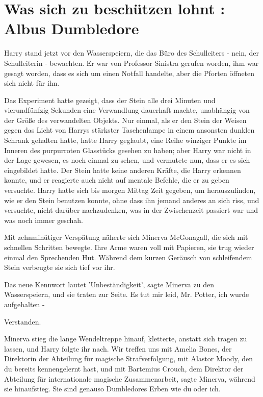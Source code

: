 \chapter{Was sich zu beschützen lohnt : Albus Dumbledore}

Harry stand jetzt vor den Wasserspeiern, die das Büro des Schulleiters - nein,
der Schulleiterin - bewachten. Er war von Professor Sinistra gerufen worden, ihm
war gesagt worden, dass es sich um einen Notfall handelte, aber die Pforten
öffneten sich nicht für ihn.

Das Experiment hatte gezeigt, dass der Stein alle drei Minuten und
vierundfünfzig Sekunden eine Verwandlung dauerhaft machte, unabhängig von der
Größe des verwandelten Objekts. Nur einmal, als er den Stein der Weisen gegen
das Licht von Harrys stärkster Taschenlampe in einem ansonsten dunklen Schrank
gehalten hatte, hatte Harry geglaubt, eine Reihe winziger Punkte im Inneren des
purpurroten Glasstücks gesehen zu haben; aber Harry war nicht in der Lage
gewesen, es noch einmal zu sehen, und vermutete nun, dass er es sich eingebildet
hatte. Der Stein hatte keine anderen Kräfte, die Harry erkennen konnte, und er
reagierte auch nicht auf mentale Befehle, die er zu geben versuchte. Harry hatte
sich bis morgen Mittag Zeit gegeben, um herauszufinden, wie er den Stein
benutzen konnte, ohne dass ihn jemand anderes an sich riss, und versuchte, nicht
darüber nachzudenken, was in der Zwischenzeit passiert war und was noch immer
geschah.

Mit zehnminütiger Verspätung näherte sich Minerva McGonagall, die sich mit
schnellen Schritten bewegte. Ihre Arme waren voll mit Papieren, sie trug wieder
einmal den Sprechenden Hut. Während dem kurzen Geräusch von schleifendem Stein
verbeugte sie sich tief vor ihr.

\glqq{}Das neue Kennwort lautet 'Unbeständigkeit'\grqq{}, sagte Minerva zu den
Wasserspeiern, und sie traten zur Seite. \glqq{}Es tut mir leid, Mr. Potter, ich
wurde aufgehalten -\grqq{}

\glqq{}Verstanden.\grqq{}

Minerva stieg die lange Wendeltreppe hinauf, kletterte, anstatt sich tragen zu
lassen, und Harry folgte ihr nach. \glqq{}Wir treffen uns mit Amelia Bones, der
Direktorin der Abteilung für magische Strafverfolgung, mit Alastor Moody, den du
bereits kennengelernt hast, und mit Bartemius Crouch, dem Direktor der Abteilung
für internationale magische Zusammenarbeit\grqq{}, sagte Minerva, während sie
hinaufstieg. \glqq{}Sie sind genauso Dumbledores Erben wie du oder ich.\grqq{}

